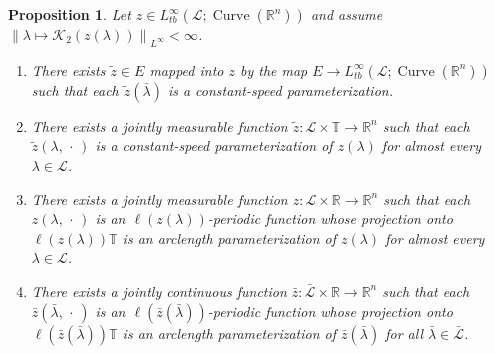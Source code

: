 \documentclass[reqno,centertags,12pt]{amsart}
\newtheorem{proposition}[theorem]{Proposition}
\theoremstyle{definition}
\numberwithin{equation}{section}
\newcommand{\norm}[1]{\left\|#1\right\|}
\newcommand{\bbR}{{\mathbb{R}}}
\newcommand{\bbT}{{\mathbb{T}}}
\begin{document}
\begin{proposition}\label{PC.9}
    Let $z\in L_{tb}^{\infty}(\mathcal{L};\operatorname{Curve}(\bbR^{n}))$ and assume
    $\norm{\lambda\mapsto \mathcal{K}_{2}(z(\lambda))}_{L^{\infty}} < \infty$.
    \begin{enumerate}
        \item There exists $\tilde{z}\in E$ mapped into $z$ by the map
        $E\to L_{tb}^{\infty}(\mathcal{L};\operatorname{Curve}(\bbR^{n}))$
        such that each $\tilde{z}(\bar{\lambda})$ is a constant-speed parameterization.

        \item There exists a jointly measurable function
        $\tilde{z}\colon\mathcal{L}\times\bbT\to \bbR^{n}$ such that
        each $\tilde{z}(\lambda,\,\cdot\,)$ is a constant-speed parameterization
        of $z(\lambda)$ for almost every $\lambda\in\mathcal{L}$.

        \item There exists a jointly measurable function
        $z\colon\mathcal{L}\times\bbR\to\bbR^{n}$ such that
        each $z(\lambda,\,\cdot\,)$ is an $\ell(z(\lambda))$-periodic function
        whose projection onto $\ell(z(\lambda))\bbT$ is an arclength parameterization
        of $z(\lambda)$ for almost every $\lambda\in\mathcal{L}$.

        \item There exists a jointly continuous function
        $\bar{z}\colon\bar{\mathcal{L}}\times\bbR\to\bbR^{n}$ such that
        each $\bar{z}(\bar{\lambda},\,\cdot\,)$ is an $\ell(\bar{z}(\bar{\lambda}))$-periodic
        function whose projection onto $\ell(\bar{z}(\bar{\lambda}))\bbT$ is an
        arclength parameterization of $\bar{z}(\bar{\lambda})$
        for all $\bar{\lambda}\in\bar{\mathcal{L}}$.
    \end{enumerate}
\end{proposition}
\end{document}
